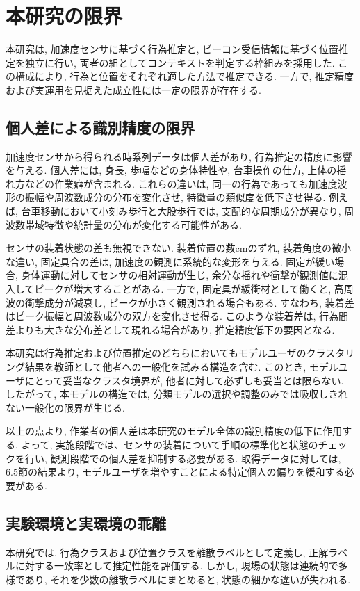 \documentclass[a4paper,12pt]{jreport}
\begin{document}
\chapter{本研究の限界}

本研究は, 加速度センサに基づく行為推定と, ビーコン受信情報に基づく位置推定を独立に行い, 両者の組としてコンテキストを判定する枠組みを採用した. この構成により, 行為と位置をそれぞれ適した方法で推定できる. 一方で, 推定精度および実運用を見据えた成立性には一定の限界が存在する. 


\section{個人差による識別精度の限界}
加速度センサから得られる時系列データは個人差があり, 行為推定の精度に影響を与える. 個人差には, 身長, 歩幅などの身体特性や, 台車操作の仕方, 上体の揺れ方などの作業癖が含まれる. これらの違いは, 同一の行為であっても加速度波形の振幅や周波数成分の分布を変化させ, 特徴量の類似度を低下させ得る. 例えば, 台車移動において小刻み歩行と大股歩行では, 支配的な周期成分が異なり, 周波数帯域特徴や統計量の分布が変化する可能性がある. 

センサの装着状態の差も無視できない. 装着位置の数cmのずれ, 装着角度の微小な違い, 固定具合の差は, 加速度の観測に系統的な変形を与える. 固定が緩い場合, 身体運動に対してセンサの相対運動が生じ, 余分な揺れや衝撃が観測値に混入してピークが増大することがある. 一方で, 固定具が緩衝材として働くと, 高周波の衝撃成分が減衰し, ピークが小さく観測される場合もある. すなわち, 装着差はピーク振幅と周波数成分の双方を変化させ得る. このような装着差は, 行為間差よりも大きな分布差として現れる場合があり, 推定精度低下の要因となる. 

本研究は行為推定および位置推定のどちらにおいてもモデルユーザのクラスタリング結果を教師として他者への一般化を試みる構造を含む. このとき, モデルユーザにとって妥当なクラスタ境界が, 他者に対して必ずしも妥当とは限らない. したがって, 本モデルの構造では, 分類モデルの選択や調整のみでは吸収しきれない一般化の限界が生じる. 

以上の点より, 作業者の個人差は本研究のモデル全体の識別精度の低下に作用する. よって, 実施段階では、センサの装着について手順の標準化と状態のチェックを行い, 観測段階での個人差を抑制する必要がある. 取得データに対しては, 6.5節の結果より, モデルユーザを増やすことによる特定個人の偏りを緩和する必要がある. 



\section{実験環境と実環境の乖離}
本研究では, 行為クラスおよび位置クラスを離散ラベルとして定義し, 正解ラベルに対する一致率として推定性能を評価する. しかし, 現場の状態は連続的で多様であり, それを少数の離散ラベルにまとめると, 状態の細かな違いが失われる.
\end{document}
